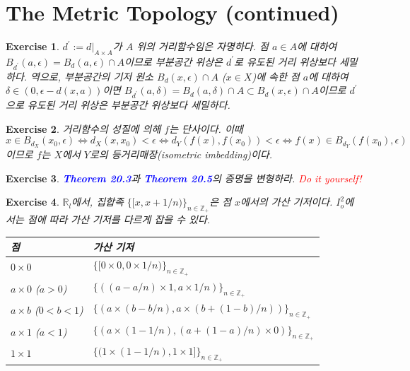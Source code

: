 \documentclass{article}
\newtheorem{exercise}{Exercise}[section]
\newcommand{\R}{\mathbb{R}}
\newcommand{\Z}{\mathbb{Z}}
\begin{document}
\section{The Metric Topology (continued)}

\begin{exercise}
	\label{exc:21.1}
    $d^\prime:=d\vert_{A\times A}$가 $A$ 위의 거리함수임은 자명하다. 점 $a\in A$에 대하여 $B_{d^\prime}(a,\epsilon)=B_d(a,\epsilon)\cap A$이므로 부분공간 위상은 $d^\prime$로 유도된 거리 위상보다 세밀하다. 역으로, 부분공간의 기저 원소 $B_d(x,\epsilon)\cap A$ ($x\in X$)에 속한 점 $a$에 대하여 $\delta\in(0,\epsilon-d(x,a))$이면 $B_{d^\prime}(a,\delta)=B_d(a,\delta)\cap A\subset B_d(x,\epsilon)\cap A$이므로 $d^\prime$으로 유도된 거리 위상은 부분공간 위상보다 세밀하다.
\end{exercise}

\begin{exercise}
    거리함수의 성질에 의해 $f$는 단사이다. 이때
    \[
        x\in B_{d_X}(x_0,\epsilon)\Longleftrightarrow d_X(x,x_0)<\epsilon \Longleftrightarrow d_Y(f(x),f(x_0))<\epsilon\Longleftrightarrow f(x)\in B_{d_Y}(f(x_0),\epsilon)
    \]
    이므로 $f$는 $X$에서 $Y$로의 등거리매장(isometric imbedding)이다.
\end{exercise}

\begin{exercise}
    \textcolor{blue}{\textbf{Theorem 20.3}}과 \textcolor{blue}{\textbf{Theorem 20.5}}의 증명을 변형하라. \textcolor{red}{Do it yourself!}
\end{exercise}

\begin{exercise}
    $\R_l$에서, 집합족 $\{[x,x+1/n)\}_{n\in\Z_+}$은 점 $x$에서의 가산 기저이다. $I_o^2$에서는 점에 따라 가산 기저를 다르게 잡을 수 있다.
    \begin{table}[H]
    	\centering
        \begin{tabular}{l|l}
            \toprule
            점 & 가산 기저 \\
            \midrule
            $0\times 0$ & $\{[0\times 0,0\times1/n)\}_{n\in\Z_+}$ \\
            \midrule
            $a\times 0$ ($a>0$) & $\{((a-a/n)\times1,a\times1/n)\}_{n\in\Z_+}$ \\
            \midrule
            $a\times b$ ($0<b<1$) & $\{(a\times(b-b/n),a\times(b+(1-b)/n))\}_{n\in\Z_+}$ \\
            \midrule
            $a\times 1$ ($a<1$) & $\{(a\times(1-1/n),(a+(1-a)/n)\times0)\}_{n\in\Z_+}$ \\
            \midrule
            $1\times 1$ & $\{(1\times (1-1/n),1\times 1]\}_{n\in\Z_+}$ \\
            \bottomrule
        \end{tabular}
    \end{table}
\end{exercise}
\end{document}
